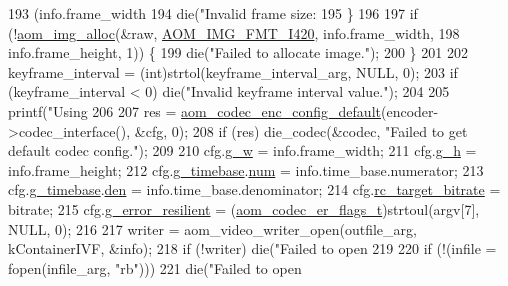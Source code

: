 \begin{DoxyCodeInclude}
{193       (info.frame\_width %
194     die(\textcolor{stringliteral}{"Invalid frame size: %
195   \}
196 
197   \textcolor{keywordflow}{if} (!\hyperlink{aom__image_8h_a570db29fbd122951235a08fe9375f6bb}{aom\_img\_alloc}(&raw, \hyperlink{aom__image_8h_a930317c04b4bd0a660bb5e744055523cabd778a3d697463e89d12a1117f417b60}{AOM\_IMG\_FMT\_I420}, info.frame\_width,
198                      info.frame\_height, 1)) \{
199     die(\textcolor{stringliteral}{"Failed to allocate image."});
200   \}
201 
202   keyframe\_interval = (int)strtol(keyframe\_interval\_arg, NULL, 0);
203   \textcolor{keywordflow}{if} (keyframe\_interval < 0) die(\textcolor{stringliteral}{"Invalid keyframe interval value."});
204 
205   printf(\textcolor{stringliteral}{"Using %
206 
207   res = \hyperlink{group__encoder_gabe456ab6f99bdebc47018779b75d2521}{aom\_codec\_enc\_config\_default}(encoder->codec\_interface(), &cfg, 0);
208   \textcolor{keywordflow}{if} (res) die\_codec(&codec, \textcolor{stringliteral}{"Failed to get default codec config."});
209 
210   cfg.\hyperlink{structaom__codec__enc__cfg_a80cb459c5ef3c7e1516f617c4c9d6eab}{g\_w} = info.frame\_width;
211   cfg.\hyperlink{structaom__codec__enc__cfg_a37b0f57b63bec8d133df8901d4407ee6}{g\_h} = info.frame\_height;
212   cfg.\hyperlink{structaom__codec__enc__cfg_a10664f1fc5b6ec29b77ee13efeeecdf7}{g\_timebase}.\hyperlink{structaom__rational_a7b48174411798c780a15f132c4650839}{num} = info.time\_base.numerator;
213   cfg.\hyperlink{structaom__codec__enc__cfg_a10664f1fc5b6ec29b77ee13efeeecdf7}{g\_timebase}.\hyperlink{structaom__rational_adeddf2ea01c12b7be66536e0a0fb92c5}{den} = info.time\_base.denominator;
214   cfg.\hyperlink{structaom__codec__enc__cfg_ab21539da477dba7506d90353c27d218b}{rc\_target\_bitrate} = bitrate;
215   cfg.\hyperlink{structaom__codec__enc__cfg_a8f3763485bb1f6eea6466b2fe0da2304}{g\_error\_resilient} = (\hyperlink{group__encoder_ga5f326af84993f371bb165883bb5a5a59}{aom\_codec\_er\_flags\_t})strtoul(argv[7], NULL,
       0);
216 
217   writer = aom\_video\_writer\_open(outfile\_arg, kContainerIVF, &info);
218   \textcolor{keywordflow}{if} (!writer) die(\textcolor{stringliteral}{"Failed to open %
219 
220   \textcolor{keywordflow}{if} (!(infile = fopen(infile\_arg, \textcolor{stringliteral}{"rb"})))
221     die(\textcolor{stringliteral}{"Failed to open %
}}}}}
\end{DoxyCodeInclude}
